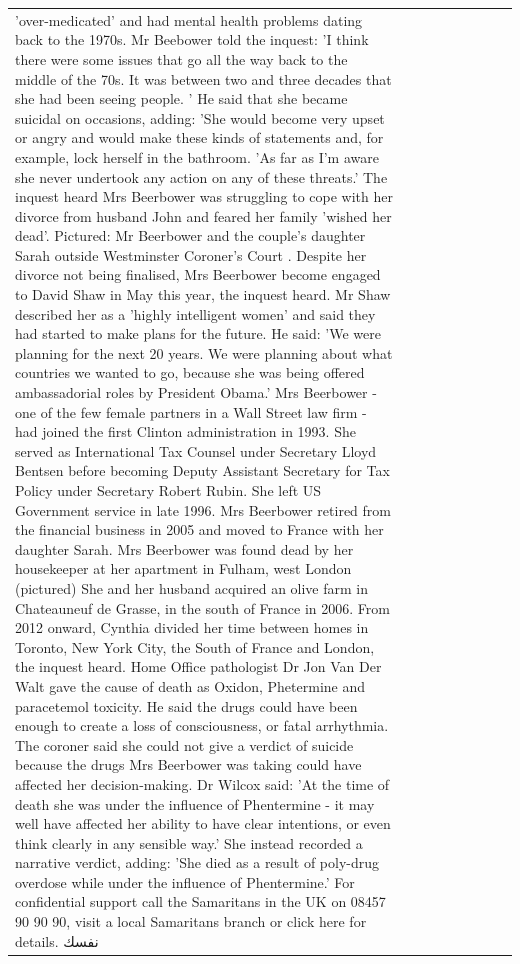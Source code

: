 \begin{table}[H]
\begin{tabular}{lllrlllll}
'over-medicated' and had mental health problems dating back to the 1970s. Mr Beebower told the inquest: 'I think there were some issues that go all the way back to the middle of the 70s. It was between two and three decades that she had been seeing people. ' He said that she became suicidal on occasions, adding: 'She would become very upset or angry and would make these kinds of statements and, for example, lock herself in the bathroom. 'As far as I'm aware she never undertook any action on any of these threats.' The inquest heard Mrs Beerbower was struggling to cope with her divorce from husband John and feared her family 'wished her dead'. Pictured: Mr Beerbower and the couple's daughter Sarah outside Westminster Coroner's Court . Despite her divorce not being finalised, Mrs Beerbower become engaged to David Shaw in May this year, the inquest heard. Mr Shaw described her as a 'highly intelligent women' and said they had started to make plans for the future. He said: 'We were planning for the next 20 years. We were planning about what countries we wanted to go, because she was being offered ambassadorial roles by President Obama.' Mrs Beerbower - one of the few female partners in a Wall Street law firm - had joined the first Clinton administration in 1993. She served as International Tax Counsel under Secretary Lloyd Bentsen before becoming Deputy Assistant Secretary for Tax Policy under Secretary Robert Rubin. She left US Government service in late 1996. Mrs Beerbower retired from the financial business in 2005 and moved to France with her daughter Sarah. Mrs Beerbower was found dead by her housekeeper at her apartment in Fulham, west London (pictured) She and her husband acquired an olive farm in Chateauneuf de Grasse, in the south of France in 2006. From 2012 onward, Cynthia divided her time between homes in Toronto, New York City, the South of France and London, the inquest heard. Home Office pathologist Dr Jon Van Der Walt gave the cause of death as Oxidon, Phetermine and paracetemol toxicity. He said the drugs could have been enough to create a loss of consciousness, or fatal arrhythmia. The coroner said she could not give a verdict of suicide because the drugs Mrs Beerbower was taking could have affected her decision-making. Dr Wilcox said: 'At the time of death she was under the influence of Phentermine - it may well have affected her ability to have clear intentions, or even think clearly in any sensible way.' She instead recorded a narrative verdict, adding: 'She died as a result of poly-drug overdose while under the influence of Phentermine.' For confidential support call the Samaritans in the UK on 08457 90 90 90, visit a local Samaritans branch or click here for details. نفسك \\

\end{tabular}
\end{table}

